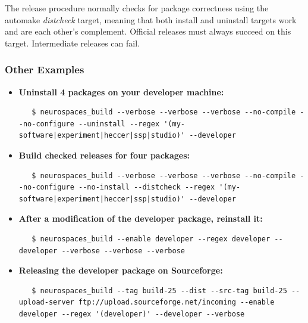 \documentclass[12pt]{article}
\begin{document}
The release procedure normally checks for package correctness using the automake {\it distcheck} target, meaning that both install and uninstall targets work and are each other's complement. Official releases must always succeed on this target. Intermediate releases can fail.


\subsubsection*{Other Examples}

\begin{itemize}
\item {\bf Uninstall 4 packages on your developer machine:}
\begin{verbatim}
   $ neurospaces_build --verbose --verbose --verbose --no-compile --no-configure --uninstall --regex '(my-software|experiment|heccer|ssp|studio)' --developer
\end{verbatim}

\item {\bf Build checked releases for four packages:}
\begin{verbatim}
   $ neurospaces_build --verbose --verbose --verbose --no-compile --no-configure --no-install --distcheck --regex '(my-software|experiment|heccer|ssp|studio)' --developer
\end{verbatim}

\item {\bf After a modification of the developer package, reinstall it:}
\begin{verbatim}
   $ neurospaces_build --enable developer --regex developer --developer --verbose --verbose --verbose
\end{verbatim}

\item {\bf Releasing the developer package on Sourceforge:}
\begin{verbatim}
   $ neurospaces_build --tag build-25 --dist --src-tag build-25 --upload-server ftp://upload.sourceforge.net/incoming --enable developer --regex '(developer)' --developer --verbose
\end{verbatim}
\end{itemize}
\end{document}
